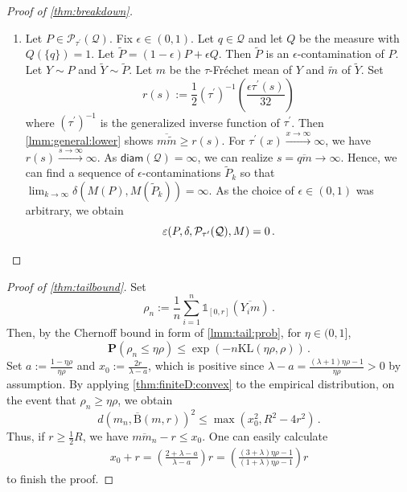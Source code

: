 \documentclass{article}
\newcommand*{\mc}[1]{\mathcal{#1}}
\newcommand{\ball}{\mathrm{B}}
\newcommand{\lb}{\left(} %
\newcommand{\rb}{\right)} %
\newcommand{\br}[1]{\lb #1 \rb} %
\newcommand{\brOf}[1]{\!\br{#1}} %
\renewcommand{\Pr}{\mathbf{P}} %
\newcommand{\PrOf}[1]{\Pr\brOf{#1}}
\newcommand{\pr}{^\prime}
\newcommand{\ind}{\mathds{1}}%
\newcommand{\eqfs}{\,.}
\newcommand{\kullback}{\mathrm{K\!L}} %
\newcommand{\ol}[2]{\overline{#1#2}}
\newcommand{\tran}{\tau}
\newcommand{\dtran}{\tau\pr}
\newcommand{\invdtran}{(\tau\pr)^{-1}}
\newcommand{\diam}{\mathsf{diam}}
\newcommand{\ballclosed}{\overline{\ball}}
\begin{document}
\begin{proof}[Proof of \cref{thm:breakdown}]
\begin{enumerate}[label=(\roman*)]
        \item
        Let $P \in \mc P_{\dtran}(\mc Q)$.
        Fix $\epsilon\in(0,1)$.
        Let $q\in\mc Q$ and let $Q$ be the measure with $Q(\{q\})=1$. Let $\tilde P = (1-\epsilon)P + \epsilon Q$. Then $\tilde P$ is an $\epsilon$-contamination of $P$. Let $Y \sim P$ and $\tilde Y \sim \tilde P$. Let $m$ be the $\tran$-Fr\'echet mean of $Y$ and $\tilde m$ of $\tilde Y$. 
        Set
        \begin{equation}
           r(s) := \frac12 \invdtran\brOf{\frac{\epsilon \dtran(s)}{32}}
        \end{equation}
        where $\invdtran$ is the generalized inverse function of $\dtran$.
        Then \cref{lmm:general:lower} shows $\ol m{\tilde m} \geq r(s)$.
        For $\dtran(x) \xrightarrow{x\to\infty} \infty$, we have $r(s)\xrightarrow{s\to\infty} \infty$.
        As $\diam(\mc Q) = \infty$, we can realize $s = \ol qm \to \infty$. Hence, we can find a sequence of $\epsilon$-contaminations $\tilde P_k$ so that $\lim_{k\to\infty}\delta(M(P), M(\tilde P_k)) = \infty$. As the choice of $\epsilon\in(0,1)$ was arbitrary, we obtain 
        \begin{equation}
            \varepsilon(P, \delta, \mc P_{\dtran}(\mc Q), M) = 0
            \eqfs
            \qedhere
        \end{equation}
    \end{enumerate}
\end{proof}
%
\begin{proof}[Proof of \cref{thm:tailbound}]
    Set
    \begin{equation}
        \rho_n := \frac1n \sum_{i=1}^n \ind_{[0,r]}(\ol {Y_i}{m})
        \eqfs
    \end{equation}
    Then, by the Chernoff bound in form of \cref{lmm:tail:prob}, for $\eta\in(0,1]$,
    \begin{equation}
        \PrOf{\rho_n \leq \eta \rho}
        \leq
        \exp\brOf{-n \kullback(\eta\rho, \rho)}
        \eqfs
    \end{equation}
    Set $a := \frac{1-\eta\rho}{\eta\rho}$ and $x_0 := \frac{2r}{\lambda - a}$, which is
    positive since $\lambda - a = \frac{(\lambda+1)\eta\rho - 1}{\eta\rho} > 0$ by assumption.
    By applying \cref{thm:finiteD:convex} to the empirical distribution, on the event that
    $\rho_n \geq \eta \rho$, we obtain
    \begin{equation}
        d\brOf{m_n, \ballclosed(m, r)}^2 \leq \max\brOf{x_0^2, R^2 - 4r^2}
        \eqfs
    \end{equation}
    Thus, if $r\geq \frac12 R$, we have $\ol m{m_n} - r \leq x_0$. One can easily calculate
    \begin{align}
        x_0 + r = \br{\frac{2 + \lambda - a}{\lambda - a}} r
        = \br{\frac{\br{3 + \lambda}\eta\rho - 1}{\br{1 + \lambda}\eta\rho - 1}} r
    \end{align}
    to finish the proof.
\end{proof}
\end{document}
